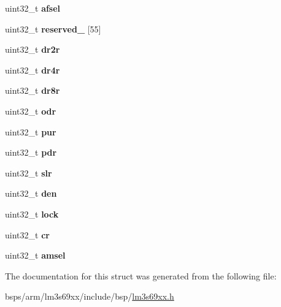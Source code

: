 \begin{DoxyCompactItemize}
uint32\+\_\+t {\bfseries afsel}
\item 
\mbox{\label{structlm3s69xx__gpio_aceacf91bf36a7962aabeea7ed4e87092}} 
uint32\+\_\+t {\bfseries reserved\+\_} \mbox{[}55\mbox{]}
\item 
\mbox{\label{structlm3s69xx__gpio_aa7ab16cd8e8a59a93137517302ec0bca}} 
uint32\+\_\+t {\bfseries dr2r}
\item 
\mbox{\label{structlm3s69xx__gpio_aa8b522ba3878c11afa2fdd96e53222f2}} 
uint32\+\_\+t {\bfseries dr4r}
\item 
\mbox{\label{structlm3s69xx__gpio_a66188f72473d57a51af1c80d16fc997e}} 
uint32\+\_\+t {\bfseries dr8r}
\item 
\mbox{\label{structlm3s69xx__gpio_ab3acf78ac9d8248f0b07790714ced72b}} 
uint32\+\_\+t {\bfseries odr}
\item 
\mbox{\label{structlm3s69xx__gpio_a09aff07ed4d51831aa6a426136791f69}} 
uint32\+\_\+t {\bfseries pur}
\item 
\mbox{\label{structlm3s69xx__gpio_a7955b1666048f7baffb9d0c18d15f094}} 
uint32\+\_\+t {\bfseries pdr}
\item 
\mbox{\label{structlm3s69xx__gpio_a0c6e471a04cecbfb03e032163621cebb}} 
uint32\+\_\+t {\bfseries slr}
\item 
\mbox{\label{structlm3s69xx__gpio_abbb48e40a9d739a8e07eff31a3349a2b}} 
uint32\+\_\+t {\bfseries den}
\item 
\mbox{\label{structlm3s69xx__gpio_afb346bc79144065ac435d1b7e11dc9ef}} 
uint32\+\_\+t {\bfseries lock}
\item 
\mbox{\label{structlm3s69xx__gpio_a4ad03d52c6099b77952e3c4ffa7b4ed8}} 
uint32\+\_\+t {\bfseries cr}
\item 
\mbox{\label{structlm3s69xx__gpio_a02ae62024f7f8420b81c6dd289faf02f}} 
uint32\+\_\+t {\bfseries amsel}
\end{DoxyCompactItemize}


The documentation for this struct was generated from the following file\+:\begin{DoxyCompactItemize}
\item 
bsps/arm/lm3s69xx/include/bsp/\mbox{\hyperlink{lm3s69xx_8h}{lm3s69xx.\+h}}\end{DoxyCompactItemize}
